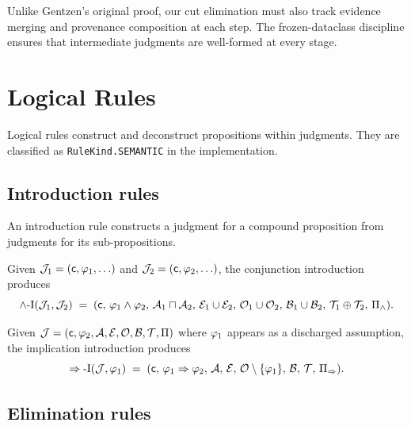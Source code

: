 \documentclass[11pt]{article}
\begin{document}
\begin{remark}
Unlike Gentzen's original proof, our cut elimination must also track
evidence merging and provenance composition at each step.  The
frozen-dataclass discipline ensures that intermediate judgments are
well-formed at every stage.
\end{remark}


\section{Logical Rules}\label{sec:logical}

Logical rules construct and deconstruct propositions within judgments.
They are classified as \texttt{RuleKind.SEMANTIC} in the implementation.

\subsection{Introduction rules}

An introduction rule constructs a judgment for a compound proposition
from judgments for its sub-propositions.

\begin{definition}
Given $\mathcal{J}_1 = (\mathsf{c}, \varphi_1, \ldots)$ and
$\mathcal{J}_2 = (\mathsf{c}, \varphi_2, \ldots)$, the conjunction introduction produces
\[
  \wedge\text{-}\mathrm{I}(\mathcal{J}_1, \mathcal{J}_2) \;=\;
  (\mathsf{c},\,\varphi_1 \wedge \varphi_2,\,\mathcal{A}_1 \sqcap \mathcal{A}_2,\,\mathcal{E}_1 \cup \mathcal{E}_2,\,\mathcal{O}_1 \cup \mathcal{O}_2,\,\mathcal{B}_1 \cup \mathcal{B}_2,\,\mathcal{T}_1 \oplus \mathcal{T}_2,\,\Pi_{\wedge}).
\]
\end{definition}

\begin{definition}
Given $\mathcal{J} = (\mathsf{c}, \varphi_2, \mathcal{A}, \mathcal{E}, \mathcal{O}, \mathcal{B}, \mathcal{T},
\Pi)$ where $\varphi_1$ appears as a discharged assumption, the
implication introduction produces
\[
  \Rightarrow\text{-}\mathrm{I}(\mathcal{J}, \varphi_1) \;=\;
  (\mathsf{c},\,\varphi_1 \Rightarrow \varphi_2,\,\mathcal{A},\,\mathcal{E},\,\mathcal{O} \setminus \{\varphi_1\},\,\mathcal{B},\,\mathcal{T},\,\Pi_{\Rightarrow}).
\]
\end{definition}

\subsection{Elimination rules}
\end{document}
